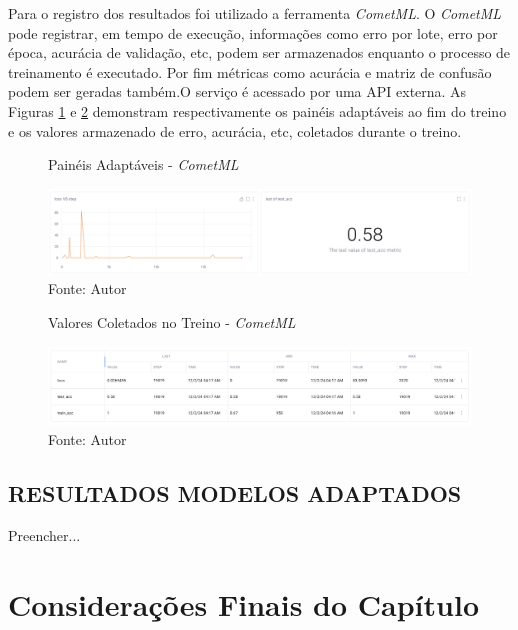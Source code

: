 Para o registro dos resultados foi utilizado a ferramenta \textit{CometML}. O \textit{CometML} pode registrar, em tempo de execução, informações como erro por lote, erro por época, acurácia de validação, etc, podem ser armazenados enquanto o processo de treinamento é executado. Por fim métricas como acurácia e matriz de confusão podem ser geradas também.O serviço é acessado  por uma \gls{API} externa. As Figuras \ref{fig:fig028} e \ref{fig:fig029} demonstram respectivamente os painéis adaptáveis ao fim do treino e os valores armazenado de erro, acurácia, etc, coletados durante o treino.

\begin{figure}[h!]
    \centering
    \caption{Painéis Adaptáveis - \textit{CometML}}
    \includegraphics[width=1\textwidth]{figures/fig028.png}
    \caption*{Fonte: Autor}
    \label{fig:fig028}
\end{figure}


\begin{figure}[h!]
    \centering
    \caption{Valores Coletados no Treino - \textit{CometML}}
    \includegraphics[width=1\textwidth]{figures/fig029.png}
    \caption*{Fonte: Autor}
    \label{fig:fig029}
\end{figure}


\subsection{RESULTADOS MODELOS ADAPTADOS}
\label{subsec:resultados_acdc_adaptado}

Preencher...

\section{Considerações Finais do Capítulo} 
\label{sec:cap6_consideracoes_finais}

